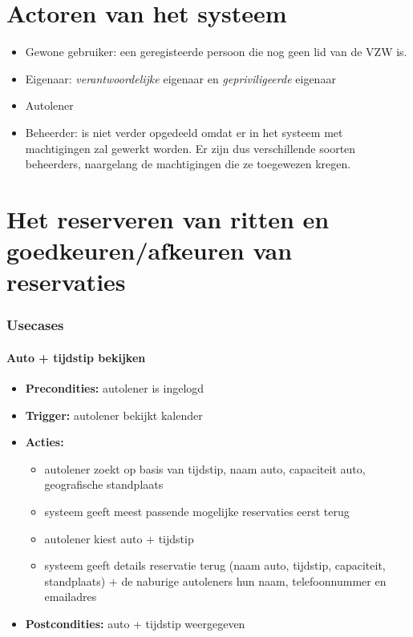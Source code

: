 \documentclass[11pt,a4paper,oneside]{article}
\begin{document}
\part{Actoren van het systeem}
\begin{itemize}

	\item Gewone gebruiker: een geregisteerde persoon die nog geen lid van de VZW is.
	\item Eigenaar: \emph{verantwoordelijke} eigenaar en \emph{gepriviligeerde} eigenaar
	\item Autolener
	\item Beheerder:  is niet verder opgedeeld omdat er in het systeem met machtigingen zal gewerkt worden. Er zijn dus verschillende soorten beheerders, naargelang de machtigingen die ze toegewezen kregen.
	
\end{itemize}

\part{Het reserveren van ritten en goedkeuren/afkeuren van reservaties}

\section{Usecases}

\subsection{Auto + tijdstip bekijken}
\begin{itemize}
\item \textbf{Precondities:} autolener is ingelogd
\item \textbf{Trigger:} autolener bekijkt kalender
\item \textbf{Acties:} \begin{itemize}
\item	autolener zoekt op basis van tijdstip, naam auto, capaciteit auto, geografische standplaats
\item	systeem geeft meest passende mogelijke reservaties eerst terug
\item	autolener kiest auto + tijdstip 
\item 	systeem geeft details reservatie terug (naam auto, tijdstip, capaciteit, standplaats) + de naburige autoleners hun naam, telefoonnummer en emailadres
\end{itemize}
\item \textbf{Postcondities:} auto + tijdstip weergegeven
\end{itemize}
\end{document}
